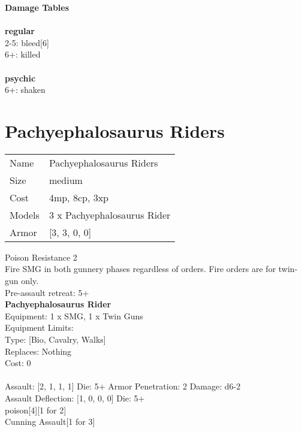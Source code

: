 {\bf Damage Tables} \\
\ \\ {\bf regular } \\
2-5: bleed[6] \\
6+: killed \\
\ \\ {\bf psychic } \\
6+: shaken \\










\pagebreak\pagebreak

\section{ Pachyephalosaurus Riders }

\begin{tabular}{ll}
  Name & Pachyephalosaurus Riders \\
  Size & medium\\
  Cost & 4mp, 8cp, 3xp\\
  Models & 3 x Pachyephalosaurus Rider\\
  Armor & [3, 3, 0, 0]\\
\end{tabular}

\noindent Poison Resistance 2\\ 
Fire SMG in both gunnery phases regardless of orders. Fire orders are for twin-gun only.\\ 
Pre-assault retreat: 5+\\ 


{\bf Pachyephalosaurus Rider } \\
Equipment: 1 x SMG, 1 x Twin Guns \\
Equipment Limits:  \\
Type: [Bio, Cavalry, Walks] \\
Replaces: Nothing \\
Cost: 0\\
\ \\
Assault: [2, 1, 1, 1] Die: 5+ Armor Penetration: 2 Damage: d6-2 \\
Assault Deflection: [1, 0, 0, 0] Die: 5+\\
\indent poison[4][1 for 2]\\ 
Cunning Assault[1 for 3]\\ 
 
\ \\

